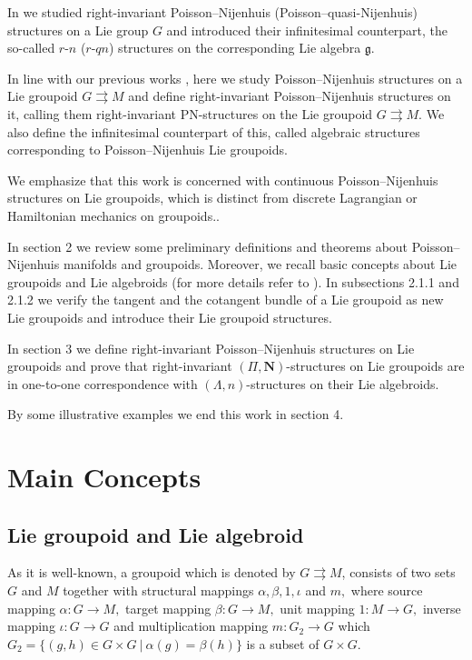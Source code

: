 \documentclass{article}
\newtheorem{definition}[theorem]{Definition}
\begin{document}
In \cite{Ravanpak, Haghighat} we studied right-invariant Poisson–Nijenhuis (Poisson–quasi-Nijenhuis) structures on a Lie group $G$ and introduced their infinitesimal counterpart, the so-called $r$-$n$ ($r$-$qn$) structures on the corresponding Lie algebra $\mathfrak{g}$.

In line with our previous works \cite{Ravanpak, Haghighat}, here we study Poisson–Nijenhuis structures on a Lie groupoid $G \rightrightarrows M$ and define right-invariant Poisson–Nijenhuis structures on it, calling them right-invariant PN-structures on the Lie groupoid $G \rightrightarrows M$. We also define the infinitesimal counterpart of this, called algebraic structures corresponding to Poisson–Nijenhuis Lie groupoids.

We emphasize that this work is concerned with continuous Poisson–Nijenhuis structures on Lie groupoids, which is distinct from discrete Lagrangian or Hamiltonian mechanics on groupoids..

In section 2 we review some preliminary definitions and theorems about Poisson–Nijenhuis manifolds and groupoids. Moreover, we recall basic concepts about Lie groupoids and Lie algebroids (for more details refer to \cite{Magri, Kosmann, Kosman2, Kiril0Mackenzie}). In subsections 2.1.1 and 2.1.2 we verify the tangent and the cotangent bundle of a Lie groupoid as new Lie groupoids and introduce their Lie groupoid structures.

In section 3 we define right-invariant Poisson–Nijenhuis structures on Lie groupoids and prove that right-invariant $(\Pi, \mathbf{N})$-structures on Lie groupoids are in one-to-one correspondence with $(\Lambda, n)$-structures on their Lie algebroids.

By some illustrative examples we end this work in section 4.
\section{ Main Concepts }
\subsection{ Lie groupoid and Lie algebroid }

As it is well-known,  a  groupoid  which is  denoted by $G \rightrightarrows M$, consists of two sets $G$ and $M$ together with structural mappings $\alpha, \beta, 1, \iota$ and $m,$  where source mapping $\alpha: G \rightarrow M,$ target mapping $\beta:G \longrightarrow M,$ unit mapping $1: M \longrightarrow G,$ inverse mapping $\iota : G \longrightarrow G $ and multiplication mapping $ m: G_{2} \longrightarrow G $ which $ G_{2} = \lbrace (g,h) \in G \times G ~\vert ~ \alpha (g) = \beta (h) \rbrace $ is a subset of $G \times G.$\\
\end{document}
